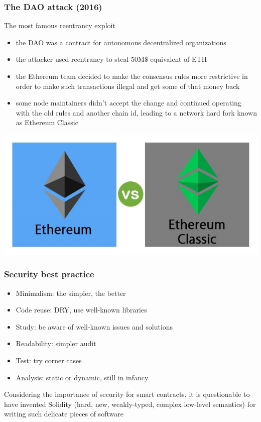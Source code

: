 \documentclass[11pt]{beamer}  %
\begin{document}
\begin{frame}\frametitle{The DAO attack (2016)}

  \begin{greenbox}{The most famous reentrancy exploit}
    \begin{itemize}
    \item the DAO was a contract for autonomous decentralized organizations
    \item the attacker used reentrancy to steal $50\text{M}\$$ equivalent of ETH
    \item the Ethereum team decided to make the consensus rules more restrictive in order
      to make such transactions illegal and get some of that money back
    \item some node maintainers didn't accept the change and continued
      operating with the old rules and another chain id, leading to a network hard fork known as
      Ethereum Classic
    \end{itemize}
  \end{greenbox}

  \begin{center}
    \includegraphics[scale=0.5,clip=false]{pictures/ethereum-vs-ethereum-classic.jpg}
  \end{center}

\end{frame}

\begin{frame}\frametitle{Security best practice}

  \begin{itemize}
  \item Minimalism: the simpler, the better
  \item Code reuse: DRY, use well-known libraries
  \item Study: be aware of well-known issues and solutions
  \item Readability: simpler audit
  \item Test: try corner cases
  \item Analysis: static or dynamic, still in infancy
  \end{itemize}

  \bigskip

  \begin{redbox}{}
    Considering the importance of security for smart contracts,
    it is questionable to have invented Solidity (hard, new, weakly-typed,
    complex low-level semantics) for writing such delicate pieces of software
  \end{redbox}

\end{frame}
\end{document}

